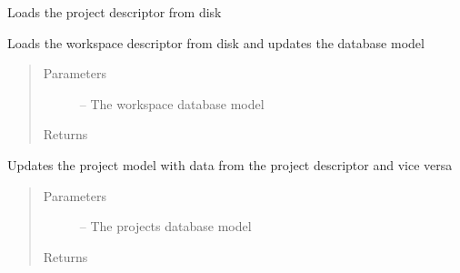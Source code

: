 \documentclass[letterpaper,10pt,english]{sphinxmanual}
\begin{document}
\begin{fulllineitems}
\label{_source/son_editor.util:son_editor.util.descriptorutil.load_project_descriptor}
Loads the project descriptor from disk

\end{fulllineitems}


\begin{fulllineitems}
\label{_source/son_editor.util:son_editor.util.descriptorutil.load_schemas}
\end{fulllineitems}


\begin{fulllineitems}
\label{_source/son_editor.util:son_editor.util.descriptorutil.load_workspace_descriptor}
Loads the workspace descriptor from disk and updates the database model
\begin{quote}\begin{description}
\item[{Parameters}] \leavevmode
{} -- The workspace database model

\item[{Returns}] \leavevmode


\end{description}\end{quote}

\end{fulllineitems}


\begin{fulllineitems}
\label{_source/son_editor.util:son_editor.util.descriptorutil.sync_project_descriptor}
Updates the project model with data from the project descriptor and vice versa
\begin{quote}\begin{description}
\item[{Parameters}] \leavevmode
{} -- The projects database model

\item[{Returns}] \leavevmode


\end{description}\end{quote}

\end{fulllineitems}
\end{document}
